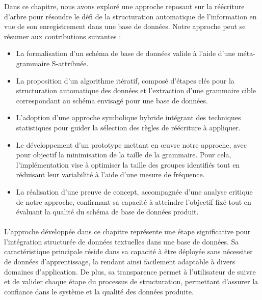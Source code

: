 Dans ce chapitre, nous avons exploré une approche reposant sur la réécriture d'arbre pour résoudre le défi de la structuration automatique de l'information en vue de son enregistrement dans une base de données.
Notre approche peut se résumer aux contributions suivantes :
\begin{itemize}
    \item La formalisation d'un schéma de base de données valide à l'aide d'une méta-grammaire S-attribuée.
    
    \item La proposition d'un algorithme itératif, composé d'étapes clés pour la structuration automatique des données et l'extraction d'une grammaire cible correspondant au schéma envisagé pour une base de données.
    
    \item L'adoption d'une approche symbolique hybride intégrant des techniques statistiques pour guider la sélection des règles de réécriture à appliquer.
 
    \item Le développement d'un prototype mettant en œuvre notre approche, avec pour objectif la minimisation de la taille de la grammaire.
    Pour cela, l'implémentation vise à optimiser la taille des groupes identifiés tout en réduisant leur variabilité à l'aide d'une mesure de fréquence.

    \item La réalisation d'une preuve de concept, accompagnée d'une analyse critique de notre approche, confirmant sa capacité à atteindre l'objectif fixé tout en évaluant la qualité du schéma de base de données produit.
\end{itemize}

\paragraph{}
L'approche développée dans ce chapitre représente une étape significative pour l'intégration structurée de données textuelles dans une base de données.
Sa caractéristique principale réside dans sa capacité à être déployée sans nécessiter de données d'apprentissage, la rendant ainsi facilement adaptable à divers domaines d'application.
De plus, sa transparence permet à l'utilisateur de suivre et de valider chaque étape du processus de structuration, permettant d'assurer la confiance dans le système et la qualité des données produite.


